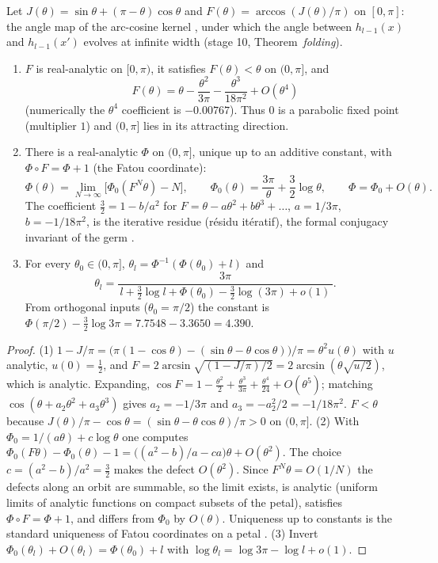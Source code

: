\label{sec:parabolic}
Let $J(\theta)=\sin\theta+(\pi-\theta)\cos\theta$ and $F(\theta)=\arccos(J(\theta)/\pi)$ on $[0,\pi]$: the angle map of the arc-cosine kernel
\cite{CS}, under which the angle between $h_{l-1}(x)$ and $h_{l-1}(x')$ evolves at infinite width (stage 10, Theorem~\emph{folding}).
\begin{theorem}\label{thm:fatou}
\begin{enumerate}[leftmargin=*]
\item $F$ is real-analytic on $[0,\pi)$, it satisfies $F(\theta)<\theta$ on $(0,\pi]$, and
\[
F(\theta)=\theta-\frac{\theta^2}{3\pi}-\frac{\theta^3}{18\pi^2}+O(\theta^4)
\]
(numerically the $\theta^4$ coefficient is $-0.00767$). Thus $0$ is a parabolic fixed point (multiplier $1$) and $(0,\pi]$ lies in its
attracting direction.
\item There is a real-analytic $\Phi$ on $(0,\pi]$, unique up to an additive constant, with $\Phi\circ F=\Phi+1$ (the Fatou coordinate):
\[
\Phi(\theta)=\lim_{N\to\infty}\big[\Phi_0(F^N\theta)-N\big],\qquad \Phi_0(\theta)=\frac{3\pi}{\theta}+\frac32\log\theta,\qquad \Phi=\Phi_0+O(\theta).
\]
The coefficient $\tfrac32=1-b/a^2$ for $F=\theta-a\theta^2+b\theta^3+\dots$, $a=1/3\pi$, $b=-1/18\pi^2$, is the iterative residue
(r\'esidu it\'eratif), the formal conjugacy invariant of the germ \cite{Milnor,Ecalle}.
\item For every $\theta_0\in(0,\pi]$, $\theta_l=\Phi^{-1}(\Phi(\theta_0)+l)$ and
\[
\theta_l=\frac{3\pi}{\,l+\tfrac32\log l+\Phi(\theta_0)-\tfrac32\log(3\pi)+o(1)\,}.
\]
From orthogonal inputs ($\theta_0=\pi/2$) the constant is $\Phi(\pi/2)-\tfrac32\log3\pi=7.7548-3.3650=4.390$.
\end{enumerate}
\end{theorem}
\begin{proof}
(1) $1-J/\pi=\big(\pi(1-\cos\theta)-(\sin\theta-\theta\cos\theta)\big)/\pi=\theta^2u(\theta)$ with $u$ analytic, $u(0)=\tfrac12$, and
$F=2\arcsin\sqrt{(1-J/\pi)/2}=2\arcsin(\theta\sqrt{u/2})$, which is analytic. Expanding, $\cos F=1-\tfrac{\theta^2}2+\tfrac{\theta^3}{3\pi}+\tfrac{\theta^4}{24}
+O(\theta^5)$; matching $\cos(\theta+a_2\theta^2+a_3\theta^3)$ gives $a_2=-1/3\pi$ and $a_3=-a_2^2/2=-1/18\pi^2$. $F<\theta$ because
$J(\theta)/\pi-\cos\theta=(\sin\theta-\theta\cos\theta)/\pi>0$ on $(0,\pi]$.
(2) With $\Phi_0=1/(a\theta)+c\log\theta$ one computes $\Phi_0(F\theta)-\Phi_0(\theta)-1=\big((a^2-b)/a-ca\big)\theta+O(\theta^2)$. The choice
$c=(a^2-b)/a^2=\tfrac32$ makes the defect $O(\theta^2)$. Since $F^N\theta=O(1/N)$ the defects along an orbit are summable, so the limit exists,
is analytic (uniform limits of analytic functions on compact subsets of the petal), satisfies $\Phi\circ F=\Phi+1$, and differs from
$\Phi_0$ by $O(\theta)$. Uniqueness up to constants is the standard uniqueness of Fatou coordinates on a petal \cite[\S10]{Milnor}.
(3) Invert $\Phi_0(\theta_l)+O(\theta_l)=\Phi(\theta_0)+l$ with $\log\theta_l=\log3\pi-\log l+o(1)$.
\end{proof}
